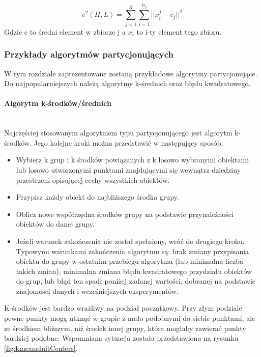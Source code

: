 \documentclass{article}
\newcommand{\myparagraph}[1]{\paragraph{#1}\mbox{}\\}
\begin{document}
\[ e^2(H,L) = \sum_{j=1}^{K}\sum_{i=1}^{n_{j}}||x_{i}^j - c_{j}||^2 \]
Gdzie c to średni element w zbiorze j a $x_{i}$ to i-ty element tego zbioru.

\subsubsection{Przykłady algorytmów partycjonujących}

W tym rozdziale zaprezentowane zostaną przykładowe algorytmy partycjonujące. Do najpopularniejszych należą algorytmy k-średnich oraz błędu kwadratowego.

\myparagraph{Algorytm k-środków/średnich}
Najczęściej stosowanym algorytmem typu partycjonującego jest algorytm k-środków. Jego kolejne kroki można przedstawić w następujący sposób:
\begin{itemize}
	\item Wybierz k grup i k środków powiązanych z k losowo wybranymi obiektami lub losowo utworzonymi punktami znajdującymi się wewnątrz dziedziny przestrzeni opisującej cechy wszystkich obiektów.
	\item Przypisz każdy obiekt do najbliższego środka grupy.
	\item Oblicz nowe współrzędna środków grupy na podstawie przynależności obiektów do danej grupy. 
	\item 	Jeżeli warunek zakończenia nie został spełniony, wróć do drugiego kroku. Typowymi warunkami zakończenia algorytmu są: brak zmiany przypisania obiektu do grupy w ostatnim przebiegu algorytmu (lub minimalna liczba takich zmian), minimalna zmiana błędu kwadratowego przydziału obiektów do grup, lub błąd ten spadł poniżej zadanej wartości, dobranej na podstawie znajomości danych i wcześniejszych eksperymentów.
\end{itemize}

K-środków jest bardzo wrażliwy na podział początkowy. Przy złym podziale pewne punkty  mogą utknąć w grupie z mało podobnymi do siebie punktami, ale ze środkiem bliższym, niż środek innej grupy, która mogłaby zawierać punkty bardziej podobne. Wspomniana sytuacja została przedstawiona na rysunku \ref{fig:kmeansInitCenters}.
\end{document}
